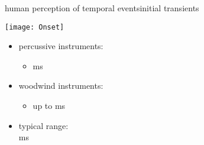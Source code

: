         \begin{frame}{human perception of temporal events}{initial transients}
            \begin{flushright}
                \texttt{[image: Onset]}
            \end{flushright}
            \vspace{-30mm}
           \begin{itemize}
                \item	percussive instruments:
                \begin{itemize}
                    \item   \unit[3-20]{ms}
                \end{itemize}
                \smallskip
                \item	woodwind instruments:
                \begin{itemize}
                    \item   up to \unit[300]{ms}
                \end{itemize}
                \bigskip
                \item<2->	typical range:\\ \unit[15--50]{ms}
            \end{itemize}
        \end{frame}
